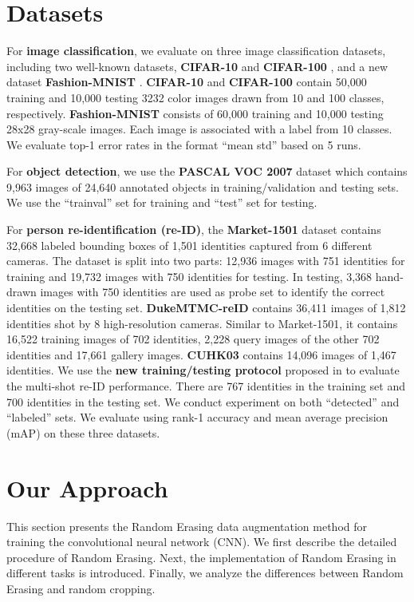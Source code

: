 \documentclass[10pt,twocolumn,letterpaper]{article}
\begin{document}
\section{Datasets}
For \textbf{image classification}, we evaluate on three image classification datasets, including two well-known datasets, \textbf{CIFAR-10} and \textbf{CIFAR-100} \cite{cifar}, and a new dataset  \textbf{Fashion-MNIST} \cite{xiao2017fashion}. \textbf{CIFAR-10} and \textbf{CIFAR-100} contain 50,000 training and 10,000 testing 3232 color images drawn from 10 and 100 classes, respectively. \textbf{Fashion-MNIST} consists of 60,000 training and 10,000 testing 28x28 gray-scale images. Each image is associated with a label from 10 classes. We evaluate top-1 error rates in the format ``mean  std'' based on 5 runs.

For \textbf{object detection}, we use the \textbf{PASCAL VOC 2007} \cite{everingham2010pascal} dataset which contains 9,963 images of 24,640 annotated objects in training/validation and testing sets. We use the ``trainval'' set for training and ``test'' set for testing.  

For \textbf{person re-identification (re-ID)}, the \textbf{Market-1501} dataset \cite{zheng2015scalable} contains 32,668 labeled bounding boxes of 1,501 identities captured from 6 different cameras.  The dataset is split into two parts: 12,936 images with 751 identities for training and 19,732 images with 750 identities for testing. In testing, 3,368 hand-drawn images with 750 identities are used as probe set to identify the correct identities on the testing set. \textbf{DukeMTMC-reID} \cite{zheng2017unlabeled,ristani2016MTMC} contains 36,411 images of 1,812 identities shot by 8 high-resolution cameras. Similar to Market-1501, it contains 16,522 training images of 702 identities, 2,228 query images of the other 702 identities and 17,661 gallery images. \textbf{CUHK03} \cite{CUHK03} contains 14,096 images of 1,467 identities. We use the \textbf{new training/testing protocol} proposed in  \cite{zhong2017re} to evaluate the multi-shot re-ID performance. There are 767 identities in the training set and 700 identities in the testing set. We conduct experiment on both ``detected'' and ``labeled'' sets. We evaluate using rank-1 accuracy and mean average precision (mAP) on these three datasets.


\section{Our Approach}
       This section presents the Random Erasing data augmentation method for training the convolutional neural network (CNN). We first describe the detailed procedure of Random Erasing. Next, the implementation of Random Erasing in different tasks is introduced. Finally, we analyze the differences between Random Erasing and random cropping.
       
\end{document}
